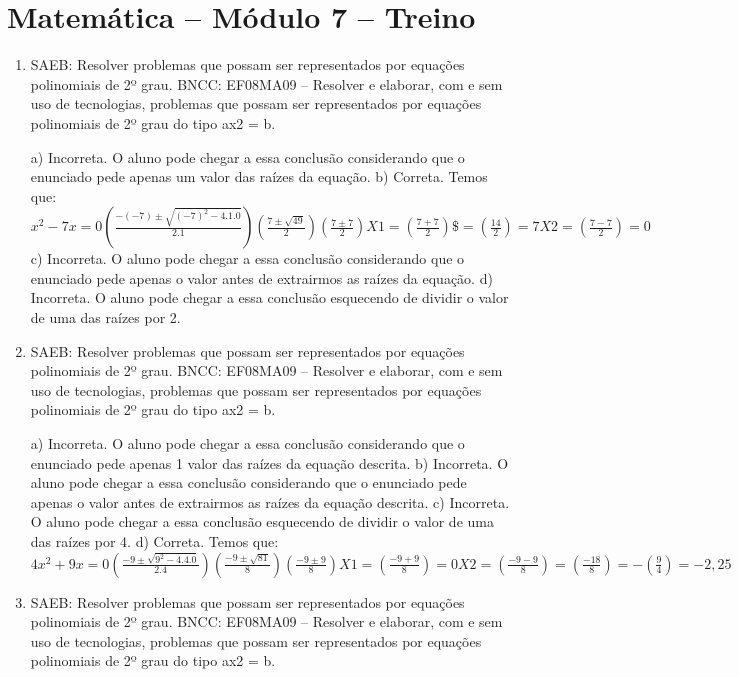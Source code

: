 \section*{Matemática – Módulo 7 – Treino}

\begin{enumerate}
\item SAEB: Resolver problemas que possam ser representados por equações
polinomiais de 2º grau.
BNCC: EF08MA09 -- Resolver e elaborar, com e sem uso de tecnologias,
problemas que possam ser representados por equações polinomiais de 2º
grau do tipo ax2 = b.

a) Incorreta. O aluno pode chegar a essa conclusão considerando que
o enunciado pede apenas um valor das raízes da equação.
b) Correta. Temos que:
$x^2 - 7x = 0
(\frac{- ( - 7) \pm \sqrt{{( - 7)}^{2} - 4.1.0}}{2.1})
(\frac{7 \pm \sqrt{49}}{2})
(\frac{7 \pm 7}{2})
X1 = (\frac{7 + 7}{2})\$ = (\frac{14}{2}) = 7
X2 = (\frac{7 - 7}{2}) = 0$
c) Incorreta. O aluno pode chegar a essa conclusão considerando que
o enunciado pede apenas o valor antes de extrairmos as raízes da
equação.
d) Incorreta. O aluno pode chegar a essa conclusão esquecendo de
dividir o valor de uma das raízes por 2.

\item SAEB: Resolver problemas que possam ser representados por equações
polinomiais de 2º grau.
BNCC: EF08MA09 -- Resolver e elaborar, com e sem uso de tecnologias,
problemas que possam ser representados por equações polinomiais de 2º
grau do tipo ax2 = b.

a) Incorreta. O aluno pode chegar a essa conclusão considerando que
o enunciado pede apenas 1 valor das raízes da equação descrita.
b) Incorreta. O aluno pode chegar a essa conclusão considerando que
o enunciado pede apenas o valor antes de extrairmos as raízes da equação
descrita.
c) Incorreta. O aluno pode chegar a essa conclusão esquecendo de
dividir o valor de uma das raízes por 4.
d) Correta. Temos que:
$4x^2 + 9x = 0
(\frac{- 9 \pm \sqrt{9^{2} - 4.4.0}}{2.4})
(\frac{- 9 \pm \sqrt{81}}{8})
(\frac{- 9 \pm 9}{8})
X1 = (\frac{- 9 + 9}{8}) = 0
X2= (\frac{- 9 - 9}{8}) = (\frac{- 18}{8}) = - (\frac{9}{4}) = -2,25$

\item SAEB: Resolver problemas que possam ser representados por equações
polinomiais de 2º grau.
BNCC: EF08MA09 -- Resolver e elaborar, com e sem uso de tecnologias,
problemas que possam ser representados por equações polinomiais de 2º
grau do tipo ax2 = b.


\end{enumerate}
